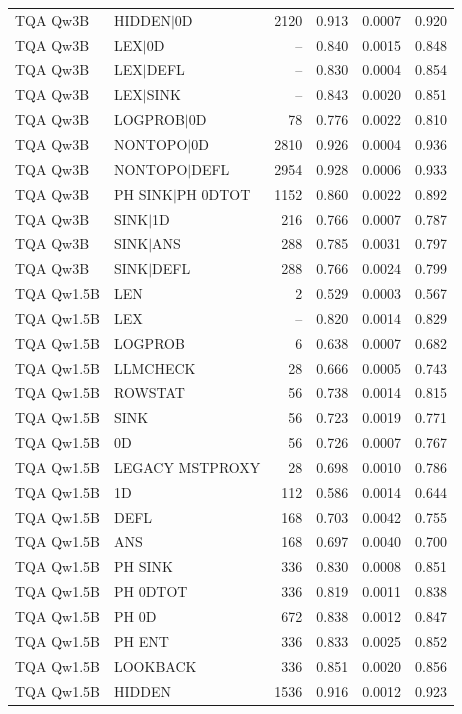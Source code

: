 \begin{longtable}{llrrrr}
TQA Qw3B & HIDDEN$\mid$0D & 2120 & 0.913 & 0.0007 & 0.920 \\
TQA Qw3B & LEX$\mid$0D & -- & 0.840 & 0.0015 & 0.848 \\
TQA Qw3B & LEX$\mid$DEFL & -- & 0.830 & 0.0004 & 0.854 \\
TQA Qw3B & LEX$\mid$SINK & -- & 0.843 & 0.0020 & 0.851 \\
TQA Qw3B & LOGPROB$\mid$0D & 78 & 0.776 & 0.0022 & 0.810 \\
TQA Qw3B & NONTOPO$\mid$0D & 2810 & 0.926 & 0.0004 & 0.936 \\
TQA Qw3B & NONTOPO$\mid$DEFL & 2954 & 0.928 & 0.0006 & 0.933 \\
TQA Qw3B & PH SINK$\mid$PH 0DTOT & 1152 & 0.860 & 0.0022 & 0.892 \\
TQA Qw3B & SINK$\mid$1D & 216 & 0.766 & 0.0007 & 0.787 \\
TQA Qw3B & SINK$\mid$ANS & 288 & 0.785 & 0.0031 & 0.797 \\
TQA Qw3B & SINK$\mid$DEFL & 288 & 0.766 & 0.0024 & 0.799 \\
TQA Qw1.5B & LEN & 2 & 0.529 & 0.0003 & 0.567 \\
TQA Qw1.5B & LEX & -- & 0.820 & 0.0014 & 0.829 \\
TQA Qw1.5B & LOGPROB & 6 & 0.638 & 0.0007 & 0.682 \\
TQA Qw1.5B & LLMCHECK & 28 & 0.666 & 0.0005 & 0.743 \\
TQA Qw1.5B & ROWSTAT & 56 & 0.738 & 0.0014 & 0.815 \\
TQA Qw1.5B & SINK & 56 & 0.723 & 0.0019 & 0.771 \\
TQA Qw1.5B & 0D & 56 & 0.726 & 0.0007 & 0.767 \\
TQA Qw1.5B & LEGACY MSTPROXY & 28 & 0.698 & 0.0010 & 0.786 \\
TQA Qw1.5B & 1D & 112 & 0.586 & 0.0014 & 0.644 \\
TQA Qw1.5B & DEFL & 168 & 0.703 & 0.0042 & 0.755 \\
TQA Qw1.5B & ANS & 168 & 0.697 & 0.0040 & 0.700 \\
TQA Qw1.5B & PH SINK & 336 & 0.830 & 0.0008 & 0.851 \\
TQA Qw1.5B & PH 0DTOT & 336 & 0.819 & 0.0011 & 0.838 \\
TQA Qw1.5B & PH 0D & 672 & 0.838 & 0.0012 & 0.847 \\
TQA Qw1.5B & PH ENT & 336 & 0.833 & 0.0025 & 0.852 \\
TQA Qw1.5B & LOOKBACK & 336 & 0.851 & 0.0020 & 0.856 \\
TQA Qw1.5B & HIDDEN & 1536 & 0.916 & 0.0012 & 0.923 \\

\end{longtable}
